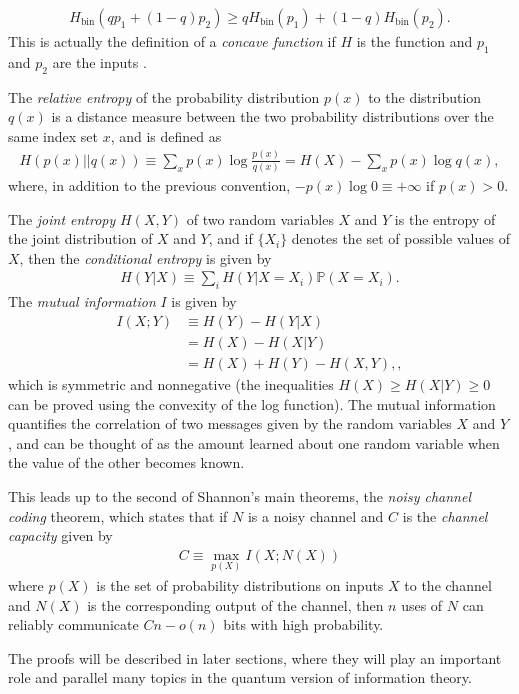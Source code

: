 \documentclass[a4paper, 12pt]{article}
\numberwithin{equation}{section}
\numberwithin{figure}{section}
\theoremstyle{definition}
\begin{document}
    \begin{align}
        H_{\text{bin}}(qp_1 + (1 - q)p_2) \geq qH_{\text{bin}}(p_1) + (1 - q)H_{\text{bin}}(p_2).
    \end{align}
    This is actually the definition of a \textit{concave function} if $H$ is the function and $p_1$ and $p_2$ are the inputs \cite{qc}. \par
    The \textit{relative entropy} of the probability distribution $p(x)$ to the distribution $q(x)$ is a distance measure between the two probability distributions over the same index set $x$, and is defined as
    \begin{align}
        H(p(x)||q(x)) \equiv \sum_x p(x) \log\frac{p(x)}{q(x)} = H(X) - \sum_x p(x) \log q(x),
    \end{align}
    where, in addition to the previous convention, $-p(x) \log 0 \equiv +\infty$ if $p(x) > 0$. \par
    The \textit{joint entropy} $H(X, Y)$ of two random variables $X$ and $Y$ is the entropy of the joint distribution of $X$ and $Y$, and if $\{ X_i \}$ denotes the set of possible values of $X$, then the \textit{conditional entropy} is given by
    \begin{align}
        H(Y | X) \equiv \sum_i H(Y | X = X_i) \mathbb{P}(X = X_i).
    \end{align}
    The \textit{mutual information} $I$ is given by
    \begin{align}
        I(X; Y) &\equiv H(Y) - H(Y | X) \label{sec:mutual1} \\
        &= H(X) - H(X | Y) \\
        &= H(X) + H(Y) - H(X, Y), \label{sec:mutual2},
    \end{align}
    which is symmetric and nonnegative (the inequalities $H(X) \geq H(X|Y) \geq 0$ can be proved using the convexity of the log function). The mutual information quantifies the correlation of two messages given by the random variables $X$ and $Y$, and can be thought of as the amount learned about one random variable when the value of the other becomes known. \par
    This leads up to the second of Shannon's main theorems, the \textit{noisy channel coding} theorem, which states that if $N$ is a noisy channel and $C$ is the \textit{channel capacity} given by
    \begin{align}
        C \equiv \max_{p(X)} I(X; N(X))
    \end{align}
    where $p(X)$ is the set of probability distributions on inputs $X$ to the channel and $N(X)$ is the corresponding output of the channel, then $n$ uses of $N$ can reliably communicate $Cn - o(n)$ bits with high probability. \par
    The proofs will be described in later sections, where they will play an important role and parallel many topics in the quantum version of information theory.
\end{document}
